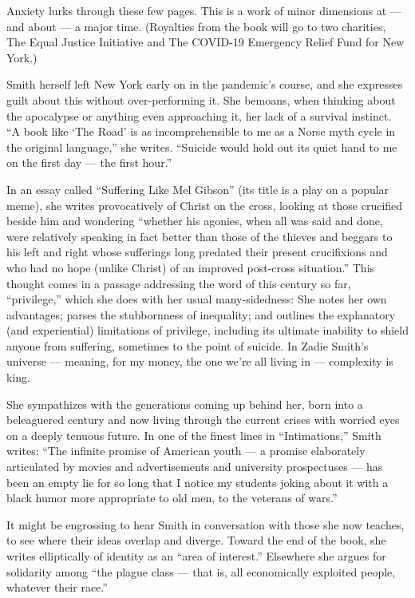 Anxiety lurks through these few pages. This is a work of minor
dimensions at --- and about --- a major time. (Royalties from the book
will go to two charities, The Equal Justice Initiative and The COVID-19
Emergency Relief Fund for New York.)

Smith herself left New York early on in the pandemic's course, and she
expresses guilt about this without over-performing it. She bemoans, when
thinking about the apocalypse or anything even approaching it, her lack
of a survival instinct. ``A book like `The Road' is as incomprehensible
to me as a Norse myth cycle in the original language,'' she writes.
``Suicide would hold out its quiet hand to me on the first day --- the
first hour.''

In an essay called ``Suffering Like Mel Gibson'' (its title is a play on
a popular meme), she writes provocatively of Christ on the cross,
looking at those crucified beside him and wondering ``whether his
agonies, when all was said and done, were relatively speaking in fact
better than those of the thieves and beggars to his left and right whose
sufferings long predated their present crucifixions and who had no hope
(unlike Christ) of an improved post-cross situation.'' This thought
comes in a passage addressing the word of this century so far,
``privilege,'' which she does with her usual many-sidedness: She notes
her own advantages; parses the stubbornness of inequality; and outlines
the explanatory (and experiential) limitations of privilege, including
its ultimate inability to shield anyone from suffering, sometimes to the
point of suicide. In Zadie Smith's universe --- meaning, for my money,
the one we're all living in --- complexity is king.

She sympathizes with the generations coming up behind her, born into a
beleaguered century and now living through the current crises with
worried eyes on a deeply tenuous future. In one of the finest lines in
``Intimations,'' Smith writes: ``The infinite promise of American youth
--- a promise elaborately articulated by movies and advertisements and
university prospectuses --- has been an empty lie for so long that I
notice my students joking about it with a black humor more appropriate
to old men, to the veterans of wars.''

It might be engrossing to hear Smith in conversation with those she now
teaches, to see where their ideas overlap and diverge. Toward the end of
the book, she writes elliptically of identity as an ``area of
interest.'' Elsewhere she argues for solidarity among ``the plague class
--- that is, all economically exploited people, whatever their race.''

